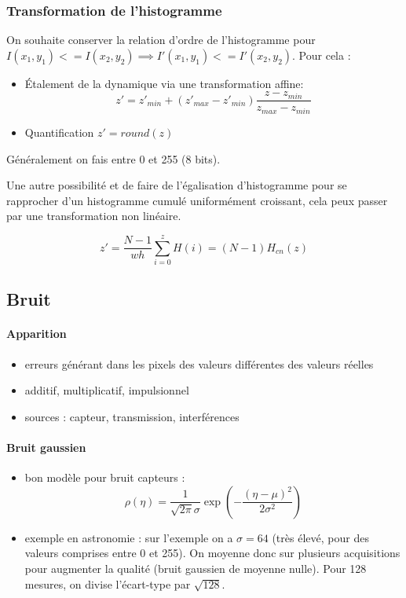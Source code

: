 \documentclass[main.tex]{subfiles}
\begin{document}
\subsubsection{Transformation de l'histogramme}

On souhaite conserver la relation d'ordre de l'histogramme pour $I(x_1,y_1) <= I(x_2,y_2) \implies I'(x_1,y_1) <= I'(x_2,y_2)$.
Pour cela :

\begin{itemize}
\item Étalement de la dynamique via une transformation affine:
\[
  \boxed{
    z' = z'_{min} + (z'_{max}-z'_{min}) \frac{z-z_{min}}{z_{max}-z_{min}}
  }
\]
\item Quantification $z' = round(z)$

\end{itemize}

\begin{rem}
  Généralement on fais entre 0 et 255  (8 bits).
\end{rem}

Une autre possibilité et de faire de l'égalisation d'histogramme pour se rapprocher d'un histogramme cumulé uniformément croissant, cela peux passer par une transformation non linéaire.


\[
  z' = \frac{N-1}{wh}\sum_{i=0}^{z}H(i) = (N-1)H_{cn}(z)
\]


\subsection{Bruit}

\paragraph{Apparition}
\begin{itemize}
\item erreurs générant dans les pixels des valeurs différentes des valeurs réelles
\item additif, multiplicatif, impulsionnel
\item sources : capteur, transmission, interférences
\end{itemize}

\paragraph{Bruit gaussien}
\begin{itemize}
\item bon modèle pour bruit capteurs :
\[ \rho(\eta)= \frac{1}{\sqrt{2\pi}\sigma}\exp(-\frac{(\eta-\mu)^2}{2\sigma^2})\]
\item exemple en astronomie : sur l'exemple on a $\sigma=64$ (très élevé, pour des valeurs comprises entre 0 et 255). On moyenne donc sur plusieurs acquisitions pour augmenter la qualité (bruit gaussien de moyenne nulle). Pour 128 mesures, on divise l'écart-type par $\sqrt{128}$.
\end{itemize}
\end{document}
